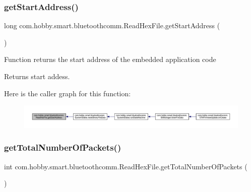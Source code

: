 \subsubsection{\texorpdfstring{get\+Start\+Address()}{getStartAddress()}}
{\footnotesize\ttfamily long com.\+hobby.\+smart.\+bluetoothcomm.\+Read\+Hex\+File.\+get\+Start\+Address (\begin{DoxyParamCaption}{ }\end{DoxyParamCaption})}

Function returns the start address of the embedded application code \begin{DoxyReturn}{Returns}
start addess. 
\end{DoxyReturn}
Here is the caller graph for this function\+:\nopagebreak
\begin{figure}[H]
\begin{center}
\leavevmode
\includegraphics[width=350pt]{classcom_1_1hobby_1_1smart_1_1bluetoothcomm_1_1_read_hex_file_aeb5e651ddbcbfe813d0ce57efac2ff31_icgraph}
\end{center}
\end{figure}
\mbox{\label{classcom_1_1hobby_1_1smart_1_1bluetoothcomm_1_1_read_hex_file_ae7deceebe800d4531c74ec4b6af7ae95}} 
\subsubsection{\texorpdfstring{get\+Total\+Number\+Of\+Packets()}{getTotalNumberOfPackets()}}
{\footnotesize\ttfamily int com.\+hobby.\+smart.\+bluetoothcomm.\+Read\+Hex\+File.\+get\+Total\+Number\+Of\+Packets (\begin{DoxyParamCaption}{ }\end{DoxyParamCaption})}

